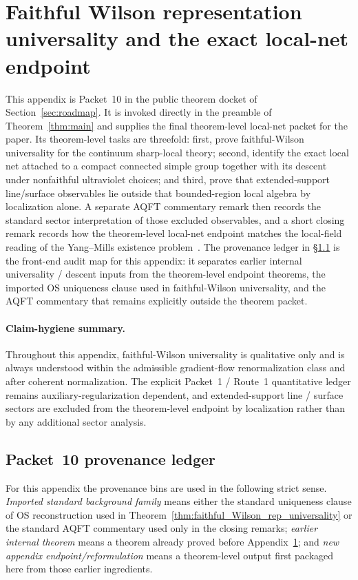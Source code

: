 \section{Faithful Wilson representation universality and the exact local-net endpoint}
\label{app:global_form_resolution}

This appendix is Packet~10 in the public theorem docket of Section~\ref{sec:roadmap}.
It is invoked directly in the preamble of Theorem~\ref{thm:main} and supplies the final theorem-level local-net packet for the paper.
Its theorem-level tasks are threefold: first, prove faithful-Wilson universality for the continuum sharp-local theory; second, identify the exact local net attached to a compact connected simple group together with its descent under nonfaithful ultraviolet choices; and third, prove that extended-support line/surface observables lie outside that bounded-region local algebra by localization alone.
A separate AQFT commentary remark then records the standard sector interpretation of those excluded observables, and a short closing remark records how the theorem-level local-net endpoint matches the local-field reading of the Yang--Mills existence problem~\cite{JaffeWittenYM}.
The provenance ledger in \S\ref{subsec:packet10_provenance_ledger} is the front-end audit map for this appendix: it separates earlier internal universality / descent inputs from the theorem-level endpoint theorems, the imported OS uniqueness clause used in faithful-Wilson universality, and the AQFT commentary that remains explicitly outside the theorem packet.

\paragraph{Claim-hygiene summary.}
Throughout this appendix, faithful-Wilson universality is qualitative only and is always understood within the admissible gradient-flow renormalization class and after coherent normalization. The explicit Packet~1 / Route~1 quantitative ledger remains auxiliary-regularization dependent, and extended-support line / surface sectors are excluded from the theorem-level endpoint by localization rather than by any additional sector analysis.

\subsection{Packet~10 provenance ledger}
\label{subsec:packet10_provenance_ledger}

For this appendix the provenance bins are used in the following strict sense.
\emph{Imported standard background family} means either the standard uniqueness clause of OS reconstruction used in Theorem~\ref{thm:faithful_Wilson_rep_universality} or the standard AQFT commentary used only in the closing remarks;
\emph{earlier internal theorem} means a theorem already proved before Appendix~\ref{app:global_form_resolution};
and \emph{new appendix endpoint/reformulation} means a theorem-level output first packaged here from those earlier ingredients.


